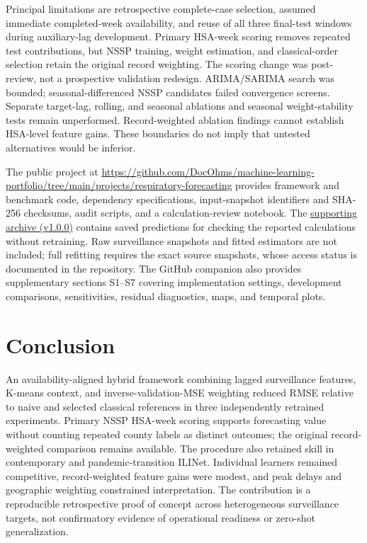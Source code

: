 \documentclass[conference,a4paper]{IEEEtran}
\begin{document}
Principal limitations are retrospective complete-case selection, assumed immediate completed-week availability, and reuse of all three final-test windows during auxiliary-lag development. Primary HSA-week scoring removes repeated test contributions, but NSSP training, weight estimation, and classical-order selection retain the original record weighting. The scoring change was post-review, not a prospective validation redesign. ARIMA/SARIMA search was bounded; seasonal-differenced NSSP candidates failed convergence screens. Separate target-lag, rolling, and seasonal ablations and seasonal weight-stability tests remain unperformed. Record-weighted ablation findings cannot establish HSA-level feature gains. These boundaries do not imply that untested alternatives would be inferior.

The public project at \url{https://github.com/DocOhms/machine-learning-portfolio/tree/main/projects/respiratory-forecasting} provides framework and benchmark code, dependency specifications, input-snapshot identifiers and SHA-256 checksums, audit scripts, and a calculation-review notebook. The \href{https://github.com/DocOhms/machine-learning-portfolio/releases/tag/respiratory-forecasting-v1.0.0}{supporting archive (v1.0.0)} contains saved predictions for checking the reported calculations without retraining. Raw surveillance snapshots and fitted estimators are not included; full refitting requires the exact source snapshots, whose access status is documented in the repository. The GitHub companion also provides supplementary sections S1--S7 covering implementation settings, development comparisons, sensitivities, residual diagnostics, maps, and temporal plots.

\section{Conclusion}
An availability-aligned hybrid framework combining lagged surveillance features, K-means context, and inverse-validation-MSE weighting reduced RMSE relative to naive and selected classical references in three independently retrained experiments. Primary NSSP HSA-week scoring supports forecasting value without counting repeated county labels as distinct outcomes; the original record-weighted comparison remains available. The procedure also retained skill in contemporary and pandemic-transition ILINet. Individual learners remained competitive, record-weighted feature gains were modest, and peak delays and geographic weighting constrained interpretation. The contribution is a reproducible retrospective proof of concept across heterogeneous surveillance targets, not confirmatory evidence of operational readiness or zero-shot generalization.
\end{document}
